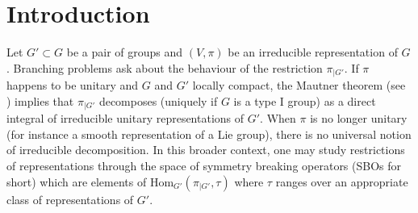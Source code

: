 \documentclass[pdftex]{sigma}
\numberwithin{equation}{section}
\theoremstyle{definition}
\newcommand{\Hom}{\mathrm{Hom}}
\theoremstyle{plain}
\theoremstyle{plain}
\theoremstyle{plain}
\theoremstyle{plain}
\begin{document}
\section{Introduction}

Let $G' \subset G$ be a pair of groups and $(V,\pi)$ be an irreducible representation of $G$. Branching problems ask about the behaviour of the restriction $\pi_{|G'}$. If $\pi$ happens to be unitary and $G$ and $G'$ locally compact, the Mautner theorem (see \cite[Theorem 1.2.]{Mautner}) implies that $\pi_{|G'}$ decomposes (uniquely if $G$ is a type I group) as a direct integral of irreducible unitary representations of $G'$. When $\pi$ is no longer unitary (for instance a smooth representation of a Lie group), there is no universal notion of irreducible decomposition. In this broader context, one may study restrictions of representations through the space of symmetry breaking operators (SBOs for short) which are elements of $\Hom_{G'}(\pi_{|G'},\tau)$ where $\tau$ ranges over an appropriate class of representations of $G'$. 
\end{document}
